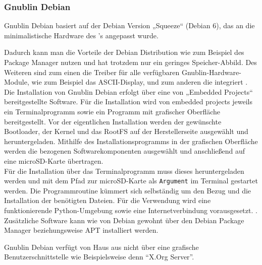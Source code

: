 \documentclass[../Bachelorarbeit.tex]{subfiles}
\begin{document}
\subsubsection*{Gnublin Debian}
\label{para:gnublin_debian} 
Gnublin Debian basiert auf der Debian Version „Squeeze“ (Debian 6), das an die 
minimalistische Hardware des 's angepasst wurde. 
\begin{comment}
Dadurch kann man die Vorteile der Debian Distribution wie zum Beispiel des Package Manager nutzen und hat trotzdem einen geringen Speicher-Footprint. 
\end{comment}
Dadurch kann man die Vorteile der Debian Distribution wie zum Beispiel des Package Manager nutzen und hat trotzdem nur ein geringes Speicher-Abbild. 
Des Weiteren sind zum einen die Treiber für alle verfügbaren Gnublin-Hardware-Module, wie zum Beispiel das \acs{ASCII}-Display, und zum anderen die  integriert
\parencite[vgl.][]{gnublin_debian}. \\
Die Installation von Gnublin Debian erfolgt über eine von „Embedded Projects“ 
bereitgestellte Software. Für die Installation wird von embedded projects jeweils ein 
Terminalprogramm sowie ein Programm mit grafischer Oberfläche bereitgestellt. Vor der 
eigentlichen Installation werden der gewünschte Bootloader, der Kernel und das \ac{RootFS}
auf der Herstellerseite ausgewählt und heruntergeladen. Mithilfe des 
Installationsprogramms in der grafischen Oberfläche werden die bezogenen 
Softwarekomponenten ausgewählt und anschließend auf eine microSD-Karte übertragen.\\
Für die Installation über das Terminalprogramm muss dieses heruntergeladen werden und 
mit dem Pfad zur microSD-Karte als \texttt{Argument} im Terminal gestartet werden. Die 
Programmroutine kümmert sich selbständig um den Bezug und die Installation der 
benötigten Dateien. Für die Verwendung wird eine funktionierende Python-Umgebung 
sowie eine Internetverbindung vorausgesetzt.
\parencite[vgl.][]{gnublin_debian_installer}. \\
Zusätzliche Software kann wie von Debian gewohnt über den Debian Package Manager 
beziehungsweise \ac{APT} installiert werden. 
\begin{comment}
Gnublin Debian verfügt von Haus aus nicht über eine grafische Benutzerschnittstelle, was für die Zielgruppe, die erfahrene Linux Anwender und Entwickler anspricht, aber kein Problem darstellen sollte.
\end{comment}
Gnublin Debian verfügt von Haus aus nicht über eine grafische Benutzerschnittstelle wie Beispielsweise denn "`X.Org Server"'.
\end{document}
